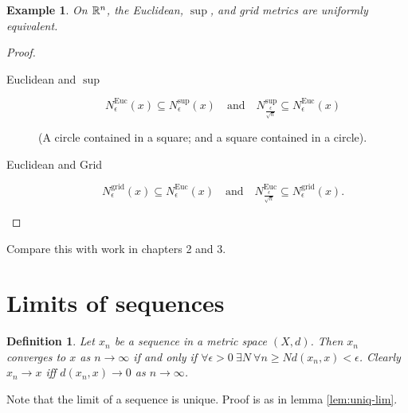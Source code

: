 \documentclass{notes}
\theoremstyle{plain}
\newtheorem{definition}[proposition]{Definition}
\newtheorem{example}[proposition]{Example}
\begin{document}
\begin{example}
On $ \mathbb{R}^{n} $, the Euclidean, $ \sup $, and grid metrics are 
uniformly equivalent.
\end{example}
\begin{proof}
\begin{description}
\item[Euclidean and $ \sup $]
\[
N_{\epsilon}^{\text{Euc}}(x) \subseteq N_{\epsilon}^{\sup}(x)
\quad \text{and} \quad
N_{\frac{\epsilon}{\sqrt{n}}}^{\sup} \subseteq N_{\epsilon}^{\text{Euc}}(x)
\]

(A circle contained in a square; and a square contained in a circle).

\item[Euclidean and Grid]
\[
N_{\epsilon}^{\text{grid}}(x) \subseteq 
N_{\epsilon}^{\text{Euc}}(x) \quad \text{and} \quad
N_{\frac{\epsilon}{\sqrt{n}}}^{\text{Euc}} \subseteq  
N_{\epsilon}^{\text{grid}}(x).
\]
\end{description}
\end{proof}

Compare this with work in chapters 2 and 3.

\section{Limits of sequences}
\begin{definition}
Let $ x_{n} $ be a sequence in a metric space $ (X,d) $. Then $ 
x_{n} $ converges to $ x $ as $ n \to \infty $ if and 
only if $\forall\epsilon>0\ \exists N\ \forall n \geq N d(x_{n},x)< 
\epsilon$.
Clearly $ x_{n} \to x $ iff $ d(x_{n},x) \to 0 $ as $ n 
\to \infty $.
\end{definition}

Note that the limit of a sequence is unique.  Proof is as in lemma
\ref{lem:uniq-lim}.
\end{document}
